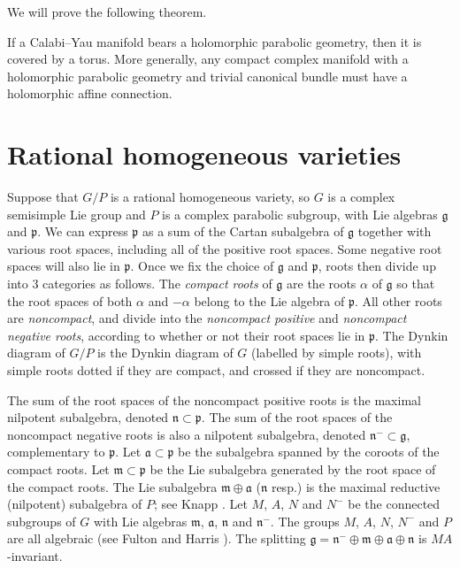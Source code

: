 \documentclass[pdftex]{sigma}
\newcommand{\LieG}{\ensuremath{\mathfrak{g}}}
\newcommand{\LieP}{\ensuremath{\mathfrak{p}}}
\newcommand{\LieM}{\ensuremath{\mathfrak{m}}}
\newcommand{\LieA}{\ensuremath{\mathfrak{a}}}
\newcommand{\LieN}{\ensuremath{\mathfrak{n}}}
\begin{document}
We will prove the following theorem.

\begin{theorem}\label{thm:CY}
If a Calabi--Yau manifold bears a holomorphic parabolic
geometry, then it is covered by a torus. More generally,
any compact complex manifold with
a holomorphic parabolic geometry and trivial
canonical bundle must have
a holomorphic affine connection.
\end{theorem}

\section{Rational homogeneous varieties}

Suppose that $G/P$ is a rational homogeneous variety,
so $G$ is a complex semisimple Lie group
and $P$ is a complex parabolic subgroup,
with Lie algebras $\LieG$ and $\LieP$. We can
express $\LieP$ as a sum
of the Cartan subalgebra of $\LieG$ together with
various root spaces, including all of the positive
root spaces. Some negative root spaces will also lie
in $\LieP$. Once we f\/ix the choice
of $\LieG$ and $\LieP$, roots then divide up into
3 categories as follows. The \emph{compact roots} of $\LieG$ are
the roots $\alpha$ of $\LieG$ so that the root spaces of
both $\alpha$ and $-\alpha$ belong to the Lie algebra
of $\LieP$.
All other roots are \emph{noncompact}, and divide
into the \emph{noncompact positive} and \emph{noncompact negative
roots}, according to whether or not their root spaces
lie in $\LieP$.
The Dynkin diagram of $G/P$ is the Dynkin
diagram of $G$ (labelled by simple roots),
with simple roots dotted if they are compact,
and crossed if they are noncompact.

The sum of the root spaces of the noncompact positive roots
is the maximal nilpotent subalgebra, denoted
$\LieN \subset \LieP$.
The sum of the root spaces of the noncompact negative roots
is also a nilpotent subalgebra, denoted
$\LieN^{-} \subset \LieG$, complementary to $\LieP$.
Let $\LieA \subset \LieP$
be the subalgebra spanned by the coroots of the compact roots.
Let $\LieM \subset \LieP$ be the Lie subalgebra generated
by the root space of the compact roots.
The Lie subalgebra
$\LieM \oplus \LieA$ ($\LieN$ resp.)
is the maximal reductive (nilpotent) subalgebra
of $P$; see Knapp \cite{Knapp:2002}.
Let $M$, $A$, $N$ and $N^-$ be the connected subgroups
of $G$ with Lie algebras
$\LieM$, $\LieA$, $\LieN$ and $\LieN^-$.
The groups $M$, $A$, $N$, $N^-$ and $P$
are all algebraic (see Fulton and Harris \cite[p.~382]{Fulton/Harris:1991}).
The splitting
$\LieG = \LieN^{-} \oplus \LieM \oplus \LieA \oplus \LieN$
is $MA$-invariant.
\end{document}
